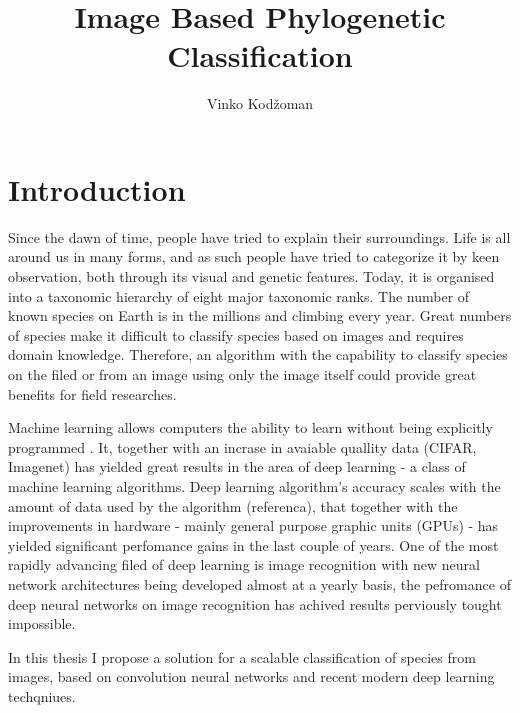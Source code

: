 \documentclass[times, utf8, diplomski]{fer}
\begin{document}
\title{Image Based Phylogenetic Classification}
\author{Vinko Kodžoman}

\maketitle

\izvornik


\tableofcontents

\chapter{Introduction}
Since the dawn of time, people have tried to explain their surroundings. Life is all around us in many forms, and as such people have tried to categorize it by keen observation, both through its visual and genetic features. Today, it is organised into a taxonomic hierarchy of eight major taxonomic ranks. The number of known species on Earth is in the millions and climbing every year. Great numbers of species make it difficult to classify species based on images and requires domain knowledge. Therefore, an algorithm with the capability to classify species on the filed or from an image using only the image itself could provide great benefits for field researches.

Machine learning allows computers the ability to learn without being explicitly programmed \citep{samuel_studies_1959}. It, together with an incrase in avaiable quallity data (CIFAR, Imagenet) has yielded great results in the area of deep learning - a class of machine learning algorithms. Deep learning algorithm's accuracy scales with the amount of data used by the algorithm (referenca), that together with the improvements in hardware - mainly general purpose graphic units (GPUs) - has yielded significant perfomance gains in the last couple of years. One of the most rapidly advancing filed of deep learning is image recognition \citep{krizhevsky_imagenet_2012, simonyan_very_2014, szegedy_going_2015, he_deep_2016} with new neural network architectures being developed almost at a yearly basis, the pefromance of deep neural networks on image recognition has achived results perviously tought 	impossible.

In this thesis I propose a solution for a scalable classification of species from images, based on convolution neural networks and recent modern deep learning techqniues.
\end{document}
